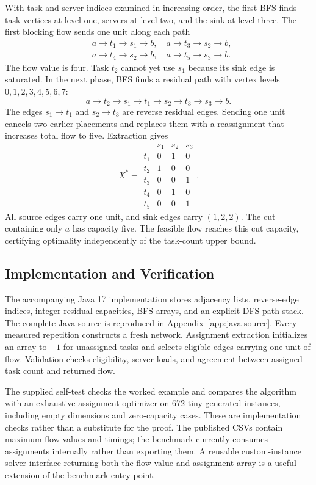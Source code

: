 \documentclass[conference]{IEEEtran}
\theoremstyle{definition}
\theoremstyle{remark}
\begin{document}
With task and server indices examined in increasing order, the first BFS
finds task vertices at level one, servers at level two, and the sink at
level three. The first blocking flow sends one unit along each path
\begin{align*}
&a\to t_1\to s_1\to b,\quad a\to t_3\to s_2\to b,\\
&a\to t_4\to s_2\to b,\quad a\to t_5\to s_3\to b.
\end{align*}
The flow value is four. Task $t_2$ cannot yet use $s_1$ because its sink
edge is saturated. In the next phase, BFS finds a residual path with
vertex levels $0,1,2,3,4,5,6,7$:
\begin{equation}
a\to t_2\to s_1\to t_1\to s_2\to t_3\to s_3\to b.
\end{equation}
The edges $s_1\to t_1$ and $s_2\to t_3$ are reverse residual edges. Sending
one unit cancels two earlier placements and replaces them with a reassignment
that increases total flow to five. Extraction gives
\begin{equation}
X^*=\begin{array}{c|ccc}
 &s_1&s_2&s_3\\\hline
t_1&0&1&0\\
t_2&1&0&0\\
t_3&0&0&1\\
t_4&0&1&0\\
t_5&0&0&1
\end{array}.
\end{equation}
All source edges carry one unit, and sink edges carry $(1,2,2)$. The cut
containing only $a$ has capacity five. The feasible flow reaches this cut
capacity, certifying optimality independently of the task-count upper bound.

\subsection{Implementation and Verification}
The accompanying Java 17 implementation stores adjacency lists, reverse-edge
indices, integer residual capacities, BFS arrays, and an explicit DFS path
stack. The complete Java source is reproduced in
Appendix~\ref{app:java-source}. Every measured repetition constructs a fresh
network. Assignment extraction initializes an array to $-1$ for unassigned tasks and selects
eligible edges carrying one unit of flow. Validation checks eligibility,
server loads, and agreement between assigned-task count and returned flow.

The supplied self-test checks the worked example and compares the algorithm
with an exhaustive assignment optimizer on 672 tiny generated instances,
including empty dimensions and zero-capacity cases. These are implementation
checks rather than a substitute for the proof. The published CSVs contain
maximum-flow values and timings; the benchmark currently consumes assignments
internally rather than exporting them. A reusable custom-instance solver
interface returning both the flow value and assignment array is a useful
extension of the benchmark entry point.
\end{document}
